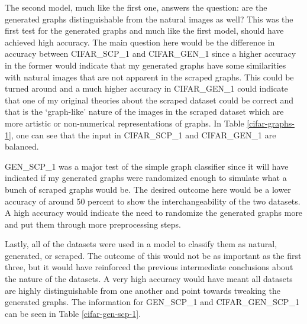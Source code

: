 \documentclass[12pt]{article}
\begin{document}
            The second model, much like the first one, answers the question: 
            are the generated graphs distinguishable from the natural images as well? 
            This was the first test for the generated graphs and much like the first model, 
            should have achieved high accuracy. The main question here would be the difference in accuracy between CIFAR\_SCP\_1 
            and CIFAR\_GEN\_1 since a higher accuracy in the former would indicate 
            that my generated graphs have some similarities with natural images that are not apparent in the scraped graphs. 
            This could be turned around and a much higher accuracy in CIFAR\_GEN\_1 could indicate 
            that one of my original theories about the scraped dataset could be correct 
            and that is the ‘graph-like’ nature of the images in the scraped dataset which are more artistic 
            or non-numerical representations of graphs. 
            In Table \ref{cifar-graphs-1}, one can see that the input in CIFAR\_SCP\_1 and CIFAR\_GEN\_1 are balanced.
                        
            GEN\_SCP\_1 was a major test of the simple graph classifier 
            since it will have indicated if my generated graphs were randomized enough to simulate what a bunch of scraped graphs would be.
            The desired outcome here would be a lower accuracy of around 50 percent to show the interchangeability of the two datasets. 
            A high accuracy would indicate the need to randomize the generated graphs more and put them through more preprocessing steps.
                        
            Lastly, all of the datasets were used in a model to classify them as natural, generated, or scraped. 
            The outcome of this would not be as important as the first three, 
            but it would have reinforced the previous intermediate conclusions about the nature of the datasets. 
            A very high accuracy would have meant all datasets are highly distinguishable from one another 
            and point towards tweaking the generated graphs. The information for GEN\_SCP\_1 and CIFAR\_GEN\_SCP\_1
            can be seen in Table \ref{cifar-gen-scp-1}.
            
\end{document}
